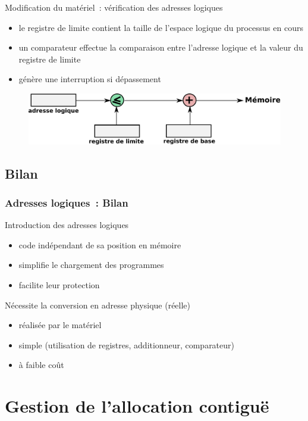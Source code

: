 \begin{frame}
  \frametitle{\insertsubsection}
  Modification du matériel~: vérification des adresses logiques
  \begin{itemize}
  \item le \alert{registre de limite} contient la taille
    de l'espace logique du processus en cours
  \item un \alert{comparateur} effectue la comparaison  entre l'adresse logique et la
    valeur du registre de limite
  \item[\ding{212}] génère une interruption si dépassement
  \end{itemize}
  \begin{figure}
    \includegraphics[width=\linewidth]{fig2/conv-log-phys2}
  \end{figure}    

\end{frame}

\subsection{Bilan}
\begin{frame}
\frametitle{Adresses logiques~: Bilan}
Introduction des \alert{adresses logiques} 
\begin{itemize}
\item code indépendant de sa position en mémoire
\item simplifie le chargement des programmes 
\item facilite leur protection 
\end{itemize}

Nécessite la conversion en adresse physique (réelle) 
\begin{itemize}
\item réalisée par le \alert{matériel}
\item simple (utilisation de registres, additionneur, comparateur)
\item à faible coût
\end{itemize}
\end{frame}

\section{Gestion de l'allocation contiguë}
